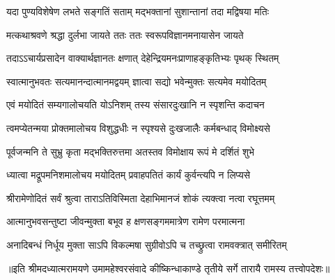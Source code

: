 \twolineshloka
{यदा पुण्यविशेषेण लभते सङ्गतिं सताम्}
{मद्भक्तानां सुशान्तानां तदा मद्विषया मतिः} %

\twolineshloka
{मत्कथाश्रवणे श्रद्धा दुर्लभा जायते ततः}
{ततः स्वरूपविज्ञानमनायासेन जायते} %

\twolineshloka
{तदाऽऽचार्यप्रसादेन वाक्यार्थज्ञानतः क्षणात्}
{देहेन्द्रियमनःप्राणाहङ्कृतिभ्यः पृथक् स्थितम्} %

\twolineshloka
{स्वात्मानुभवतः सत्यमानन्दात्मानमद्वयम्}
{ज्ञात्वा सद्यो भवेन्मुक्तः सत्यमेव मयोदितम्} %

\twolineshloka
{एवं मयोदितं सम्यगालोचयति योऽनिशम्}
{तस्य संसारदुःखानि न स्पृशन्ति कदाचन} %

\twolineshloka
{त्वमप्येतन्मया प्रोक्तमालोचय विशुद्धधीः}
{न स्पृश्यसे दुःखजालैः कर्मबन्धाद् विमोक्ष्यसे} %

\twolineshloka
{पूर्वजन्मनि ते सुभ्रु कृता मद्भक्तिरुत्तमा}
{अतस्तव विमोक्षाय रूपं मे दर्शितं शुभे} %

\twolineshloka
{ध्यात्वा मद्रूपमनिशमालोचय मयोदितम्}
{प्रवाहपतितं कार्यं कुर्वन्त्यपि न लिप्यसे} %

\twolineshloka
{श्रीरामेणोदितं सर्वं श्रुत्वा ताराऽतिविस्मिता}
{देहाभिमानजं शोकं त्यक्त्वा नत्वा रघूत्तमम्} %

\twolineshloka
{आत्मानुभवसन्तुष्टा जीवन्मुक्ता बभूव ह}
{क्षणसङ्गममात्रेण रामेण परमात्मना} %

\twolineshloka
{अनादिबन्धं निर्धूय मुक्ता साऽपि विकल्मषा}
{सुग्रीवोऽपि च तच्छ्रुत्वा रामवक्त्रात् समीरितम्} %

{॥इति श्रीमदध्यात्मरामयणे उमामहेश्वरसंवादे
कीष्किन्धाकाण्डे तृतीये सर्गे  तारायै  रामस्य  तत्त्वोपदेशः॥}
